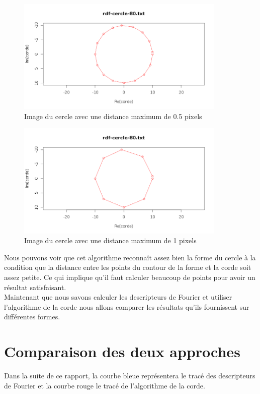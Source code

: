\documentclass[11pt]{article}
\begin{document}
  \begin{figure}[!h]
    \begin{center}
      \includegraphics[width=10cm]{../resultat/cercle-corde-5.png}
    \end{center}
    \caption{Image du cercle avec une distance maximum de 0.5 pixels}
  \end{figure}

  \begin{figure}[!h]
    \begin{center}
      \includegraphics[width=10cm]{../resultat/cercle-corde-10.png}
     \end{center}
    \caption{Image du cercle avec une distance maximum de 1 pixels}
  \end{figure}
  
  \newpage
  
  Nous pouvons voir que cet algorithme reconnaît assez bien la forme du cercle à la condition 
  que la distance entre les points du contour de la forme et la corde soit assez petite. Ce qui 
  implique qu'il faut calculer beaucoup de points pour avoir un résultat satisfaisant.\\
  
  Maintenant que nous savons calculer les descripteurs de Fourier et utiliser l'algorithme
  de la corde nous allons comparer les résultats qu'ils fournissent sur différentes formes.
  
  \section{Comparaison des deux approches}
  Dans la suite de ce rapport, la courbe bleue représentera le tracé des descripteurs de Fourier 
  et la courbe rouge le tracé de l'algorithme de la corde. 
  
\end{document}
